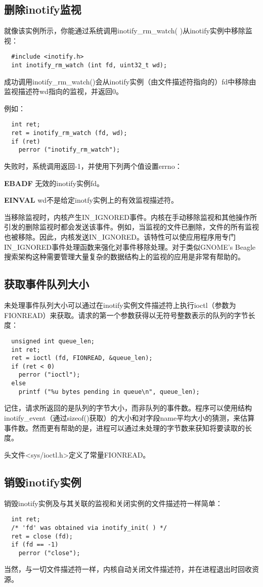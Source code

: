 \subsection{删除inotify监视}

就像该实例所示，你能通过系统调用inotify\_rm\_watch( )从inotify实例中移除监视：

\begin{lstlisting}
  #include <inotify.h>
  int inotify_rm_watch (int fd, uint32_t wd);
\end{lstlisting}

成功调用inotify\_rm\_watch()会从inotify实例（由文件描述符指向的）fd中移除由监视描述符wd指向的监视，并返回0。

例如：

\begin{lstlisting}
  int ret;
  ret = inotify_rm_watch (fd, wd);
  if (ret)
    perror ("inotify_rm_watch");
\end{lstlisting}

失败时，系统调用返回-1，并使用下列两个值设置errno：

\begin{eqlist*}
\item[\textbf{EBADF}] 无效的inotify实例fd。
\item[\textbf{EINVAL}] wd不是给定inotfy实例上的有效监视描述符。
\end{eqlist*}

当移除监视时，内核产生IN\_IGNORED事件。内核在手动移除监视和其他操作所引发的删除监视时都会发送该事件。例如，当监视的文件已删除，文件的所有监视也被移除。因此，内核发送IN\_IGNORED。该特性可以使应用程序用专门IN\_IGNORED事件处理函数来强化对事件移除处理。对于类似GNOME’s Beagle搜索架构这种需要管理大量复杂的数据结构上的监视的应用是非常有帮助的。

\subsection{获取事件队列大小}

未处理事件队列大小可以通过在inotify实例文件描述符上执行ioctl（参数为FIONREAD）来获取。请求的第一个参数获得以无符号整数表示的队列的字节长度：

\begin{lstlisting}
  unsigned int queue_len;
  int ret;
  ret = ioctl (fd, FIONREAD, &queue_len);
  if (ret < 0)
    perror ("ioctl");
  else
    printf ("%u bytes pending in queue\n", queue_len);
\end{lstlisting}

记住，请求所返回的是队列的字节大小，而非队列的事件数。程序可以使用结构inotify\_event（通过sizeof()获取）的大小和对字段name平均大小的猜测，来估算事件数。然而更有帮助的是，进程可以通过未处理的字节数来获知将要读取的长度。

头文件<sys/ioctl.h>定义了常量FIONREAD。

\subsection{销毁inotify实例}

销毁inotify实例及与其关联的监视和关闭实例的文件描述符一样简单：

\begin{lstlisting}
  int ret;
  /* 'fd' was obtained via inotify_init( ) */
  ret = close (fd);
  if (fd == -1)
    perror ("close");
\end{lstlisting}

当然，与一切文件描述符一样，内核自动关闭文件描述符，并在进程退出时回收资源。

